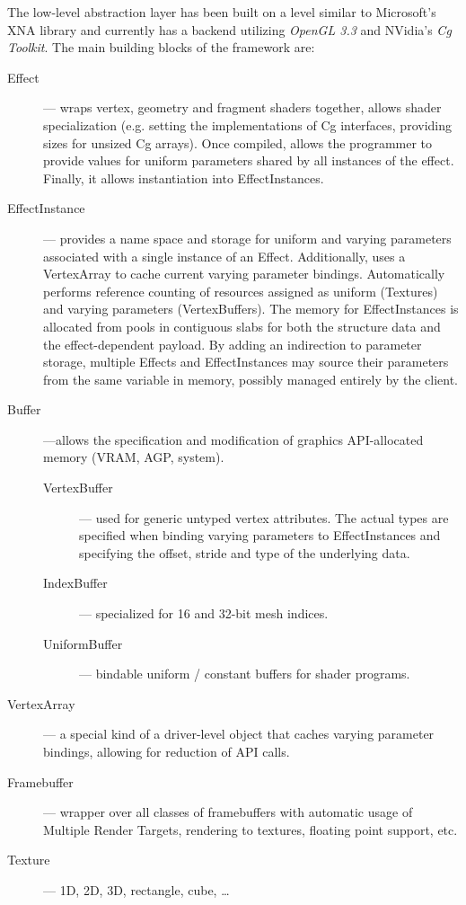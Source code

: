 The low-level abstraction layer has been built on a level similar to Microsoft's XNA library and currently has a backend utilizing \emph{OpenGL 3.3} and NVidia's \emph{Cg Toolkit}. The main building blocks of the framework are:

\begin{description}

\item[Effect] --- wraps vertex, geometry and fragment shaders together, allows shader specialization (e.g. setting the implementations of Cg interfaces, providing sizes for unsized Cg arrays). Once compiled, allows the programmer to provide values for uniform parameters shared by all instances of the effect. Finally, it allows instantiation into EffectInstances.

\item[EffectInstance] --- provides a name space and storage for uniform and varying parameters associated with a single instance of an Effect. Additionally, uses a VertexArray to cache current varying parameter bindings. Automatically performs reference counting of resources assigned as uniform (Textures) and varying parameters (VertexBuffers). The memory for EffectInstances is allocated from pools in contiguous slabs for both the structure data and the effect-dependent payload. By adding an indirection to parameter storage, multiple Effects and EffectInstances may source their parameters from the same variable in memory, possibly managed entirely by the client.

\item[Buffer] ---allows the specification and modification of graphics API-allocated memory (VRAM, AGP, system).

\begin{description}
\item[VertexBuffer] --- used for generic untyped vertex attributes. The actual types are specified when binding varying parameters to EffectInstances and specifying the offset, stride and type of the underlying data.
\item[IndexBuffer] --- specialized for 16 and 32-bit mesh indices.
\item[UniformBuffer] --- bindable uniform / constant buffers for shader programs.
\end{description}

\item[VertexArray] --- a special kind of a driver-level object that caches varying parameter bindings, allowing for reduction of API calls.

\item[Framebuffer] --- wrapper over all classes of framebuffers with automatic usage of Multiple Render Targets, rendering to textures, floating point support, etc.

\item[Texture] --- 1D, 2D, 3D, rectangle, cube, \ldots

\end{description}

